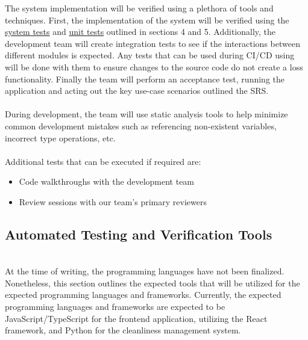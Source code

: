 \documentclass[12pt, titlepage]{article}
\begin{document}
The system implementation will be verified using a plethora of tools and techniques. First, the implementation of the system will be verified using the \hyperref[section:systemTests]{system tests} and \hyperref[section:unitTests]{unit tests} outlined in sections 4 and 5. Additionally, the development team will create integration tests to see if the interactions between different modules is expected. Any tests that can be used during CI/CD using will be done with them to ensure changes to the source code do not create a loss functionality. Finally the team will perform an acceptance test, running the application and acting out the key use-case scenarios outlined the SRS.\\
\\
During development, the team will use static analysis tools to help minimize common development mistakes such as referencing non-existent variables, incorrect type operations, etc.\\
\\ Additional tests that can be executed if required are:
\begin{itemize}
\item Code walkthroughs with the development team
\item Review sessions with our team's primary reviewers
\end{itemize}

\subsection{Automated Testing and Verification Tools}
\label{subsec:tools}


\\ 
  At the time of writing, the programming languages have not been finalized. Nonetheless, this section outlines the expected tools that will be utilized for the expected programming languages and frameworks. Currently, the expected programming languages and frameworks are expected to be JavaScript/TypeScript for the frontend application, utilizing the React framework, and Python for the cleanliness management system.
  
\end{document}
